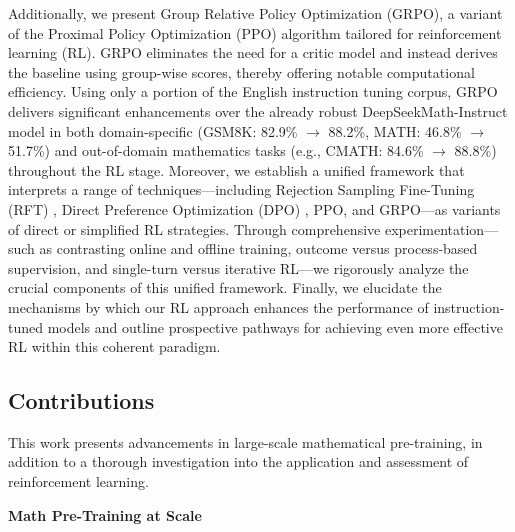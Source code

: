 Additionally, we present Group Relative Policy Optimization (GRPO), a variant of the Proximal Policy Optimization (PPO) algorithm \citep{schulman2017proximal} tailored for reinforcement learning (RL). GRPO eliminates the need for a critic model and instead derives the baseline using group-wise scores, thereby offering notable computational efficiency. Using only a portion of the English instruction tuning corpus, GRPO delivers significant enhancements over the already robust DeepSeekMath-Instruct model in both domain-specific (GSM8K: 82.9\% $\rightarrow$ 88.2\%, MATH: 46.8\% $\rightarrow$ 51.7\%) and out-of-domain mathematics tasks (e.g., CMATH: 84.6\% $\rightarrow$ 88.8\%) throughout the RL stage. Moreover, we establish a unified framework that interprets a range of techniques—including Rejection Sampling Fine-Tuning (RFT) \citep{yuan2023scaling}, Direct Preference Optimization (DPO) \citep{dpo}, PPO, and GRPO—as variants of direct or simplified RL strategies. Through comprehensive experimentation—such as contrasting online and offline training, outcome versus process-based supervision, and single-turn versus iterative RL—we rigorously analyze the crucial components of this unified framework. Finally, we elucidate the mechanisms by which our RL approach enhances the performance of instruction-tuned models and outline prospective pathways for achieving even more effective RL within this coherent paradigm.

\subsection{Contributions}
This work presents advancements in large-scale mathematical pre-training, in addition to a thorough investigation into the application and assessment of reinforcement learning.

\textbf{Math Pre-Training at Scale}

